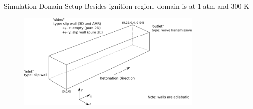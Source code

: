 \begin{frame}{Simulation Domain Setup}
Besides ignition region, domain is at 1 atm and 300 K
\begin{figure}[t!]
\centering
\includegraphics[width=0.8\textwidth]{../figs/domainBC.png}
\end{figure}%
\end{frame}

